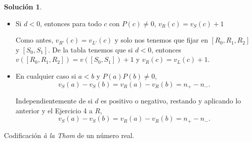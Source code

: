 \documentclass[10pt]{article}
\theoremstyle{definition}
\newtheorem*{sol}{Solución}
\begin{document}
\begin{sol}
\begin{itemize}
    
    \item Si $d<0$, entonces para todo $c$ con $P(c)\neq 0$, $v_R(c)=v_S(c)+1$
    
    Como antes, $v_{R'}(c)=v_{L'}(c)$ y solo nos tenemos que fijar en $[R_0,R_1,R_2]$ y $[S_0,S_1]$. De la tabla tenemos que si $d<0$, entonces $v([R_0,R_1,R_2])=v([S_0,S_1])+1$ y $v_R(c)=v_L(c)+1$. 
    
    \item En cualquier caso si $a<b$ y $P(a)P(b)\neq 0$,
    \[v_S(a)-v_S(b)=v_R(a)-v_R(b)=n_{+}-n_{-}.\]
    
    Independientemente de si $d$ es positivo o negativo, restando y aplicando lo anterior y el Ejercicio 4 a $R$,
    \[v_S(a)-v_S(b)=v_R(a)-v_R(b)=n_+-n_-.\]
\end{itemize}

\end{sol}
Codificación \textit{à la Thom} de un número real. 
\end{document}
